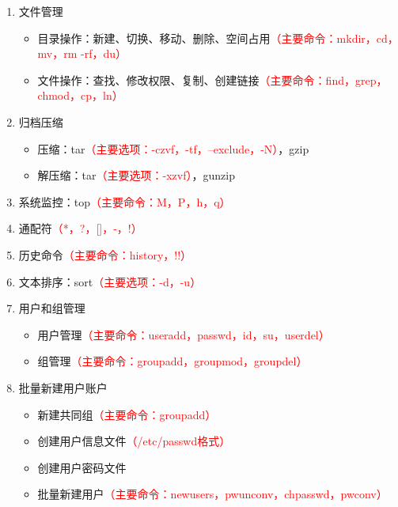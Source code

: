 \documentclass{TIJMUjiaoanSY}
\begin{document}
\begin{enumerate}
\begin{enumerate}
      \item 文件管理
	\begin{itemize}
	  \item 目录操作：新建、切换、移动、删除、空间占用\textcolor{red}{（主要命令：mkdir，cd，mv，rm -rf，du）}
	  \item 文件操作：查找、修改权限、复制、创建链接\textcolor{red}{（主要命令：find，grep，chmod，cp，ln）}
	\end{itemize}
      \item 归档压缩
	\begin{itemize}
	  \item 压缩：tar\textcolor{red}{（主要选项：-czvf，-tf，--exclude，-N）}，gzip
	  \item 解压缩：tar\textcolor{red}{（主要选项：-xzvf）}，gunzip
	\end{itemize}
      \item 系统监控：top\textcolor{red}{（主要命令：M，P，h，q）}
      \item 通配符\textcolor{red}{（*，?，[]，-，!）}
      \item 历史命令\textcolor{red}{（主要命令：history，!!）}
      \item 文本排序：sort\textcolor{red}{（主要选项：-d，-u）}
      \item 用户和组管理
	\begin{itemize}
	  \item 用户管理\textcolor{red}{（主要命令：useradd，passwd，id，su，userdel）}
	  \item 组管理\textcolor{red}{（主要命令：groupadd，groupmod，groupdel）}
	\end{itemize}
      \item 批量新建用户账户
	\begin{itemize}
	  \item 新建共同组\textcolor{red}{（主要命令：groupadd）}
	  \item 创建用户信息文件\textcolor{red}{（/etc/passwd格式）}
	  \item 创建用户密码文件
	  \item 批量新建用户\textcolor{red}{（主要命令：newusers，pwunconv，chpasswd，pwconv）}
	\end{itemize}
    \end{enumerate}
\end{enumerate}


\otherTail
\end{document}
